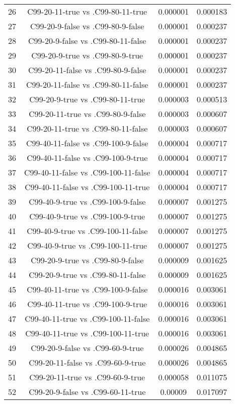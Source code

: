 \documentclass[a4paper,10pt]{article}
\begin{document}
\begin{landscape}
\begin{table}[!htp]
\begin{tabular}{cccc}
26&C99-20-11-true vs .C99-80-11-true&0.000001&0.000183\\
27&C99-20-9-false vs .C99-80-9-false&0.000001&0.000237\\
28&C99-20-9-false vs .C99-80-11-false&0.000001&0.000237\\
29&C99-20-9-true vs .C99-80-9-true&0.000001&0.000237\\
30&C99-20-11-false vs .C99-80-9-false&0.000001&0.000237\\
31&C99-20-11-false vs .C99-80-11-false&0.000001&0.000237\\
32&C99-20-9-true vs .C99-80-11-true&0.000003&0.000513\\
33&C99-20-11-true vs .C99-80-9-false&0.000003&0.000607\\
34&C99-20-11-true vs .C99-80-11-false&0.000003&0.000607\\
35&C99-40-11-false vs .C99-100-9-false&0.000004&0.000717\\
36&C99-40-11-false vs .C99-100-9-true&0.000004&0.000717\\
37&C99-40-11-false vs .C99-100-11-false&0.000004&0.000717\\
38&C99-40-11-false vs .C99-100-11-true&0.000004&0.000717\\
39&C99-40-9-true vs .C99-100-9-false&0.000007&0.001275\\
40&C99-40-9-true vs .C99-100-9-true&0.000007&0.001275\\
41&C99-40-9-true vs .C99-100-11-false&0.000007&0.001275\\
42&C99-40-9-true vs .C99-100-11-true&0.000007&0.001275\\
43&C99-20-9-true vs .C99-80-9-false&0.000009&0.001625\\
44&C99-20-9-true vs .C99-80-11-false&0.000009&0.001625\\
45&C99-40-11-true vs .C99-100-9-false&0.000016&0.003061\\
46&C99-40-11-true vs .C99-100-9-true&0.000016&0.003061\\
47&C99-40-11-true vs .C99-100-11-false&0.000016&0.003061\\
48&C99-40-11-true vs .C99-100-11-true&0.000016&0.003061\\
49&C99-20-9-false vs .C99-60-9-true&0.000026&0.004865\\
50&C99-20-11-false vs .C99-60-9-true&0.000026&0.004865\\
51&C99-20-11-true vs .C99-60-9-true&0.000058&0.011075\\
52&C99-20-9-false vs .C99-60-11-true&0.00009&0.017097\\

\end{tabular}
\end{table}
\end{landscape}
\end{document}
